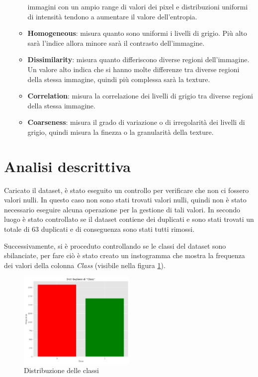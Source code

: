 \begin{enumerate}
\begin{itemize}
                        immagini con un ampio range di valori dei pixel e distribuzioni
                        uniformi di intensità tendono a aumentare il valore dell'entropia.
                  \item \textbf{Homogeneous}: misura quanto sono uniformi i livelli
                        di grigio. Più alto sarà l'indice allora minore sarà il contrasto
                        dell'immagine.
                  \item \textbf{Dissimilarity}: misura quanto differiscono diverse
                        regioni dell'immagine. Un valore alto indica che si hanno molte
                        differenze tra diverse regioni della stessa immagine, quindi più
                        complessa sarà la texture.
                  \item \textbf{Correlation}: misura la correlazione dei livelli
                        di grigio tra diverse regioni della stessa immagine.
                  \item \textbf{Coarseness}: misura il grado di variazione o di
                        irregolarità dei livelli di grigio, quindi misura la finezza o
                        la granularità della texture.
            \end{itemize}
\end{enumerate}

\section{Analisi descrittiva}\label{sec:analisi-descrittiva}

Caricato il dataset, è stato eseguito un controllo per verificare che non ci fossero
valori nulli. In questo caso non sono stati trovati valori nulli, quindi non è
stato necessario eseguire alcuna operazione per la gestione di tali valori. In
secondo luogo è stato controllato se il dataset contiene dei duplicati e sono stati
trovati un totale di $63$ duplicati e di conseguenza sono stati tutti rimossi.

Successivamente, si è proceduto controllando se le classi del dataset sono sbilanciate,
per fare ciò è stato creato un instogramma che mostra la frequenza dei valori 
della colonna \textit{Class} (visibile nella figura \ref{fig:dist-classi}).

\begin{figure}[!ht]
      \centering
      \includegraphics[width=0.5\textwidth]{img/analisi/distribuzioneClassi.png}
      \caption{Distribuzione delle classi}
      \label{fig:dist-classi}
\end{figure}

